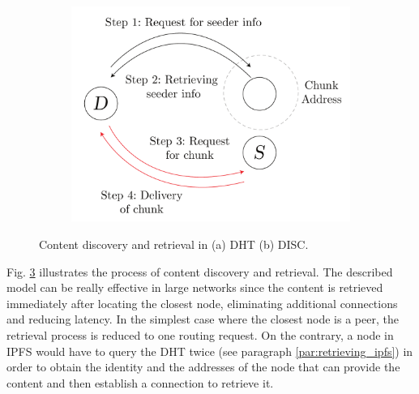 \begin{figure}
    \begin{subfigure}{0.5\textwidth}
        \centering
        \includegraphics[width=\linewidth]{figs/dht.pdf}
        \caption{}
        \label{fig:dht}
    \end{subfigure}
    \hfill
    \begin{subfigure}{0.5\textwidth}
        \centering
        \caption{}
        \label{fig:disc}
    \end{subfigure}
    \caption{Content discovery and retrieval in (a) DHT (b) DISC. \citep{tron_2020}}
    \label{fig:content_discovery}
\end{figure}

Fig. \ref{fig:content_discovery} illustrates the process of content discovery and retrieval. The described model can be really effective in large networks since the content is retrieved immediately after locating the closest node, eliminating additional connections and reducing latency. In the simplest case where the closest node is a peer, the retrieval process is reduced to one routing request. On the contrary, a node in IPFS would have to query the DHT twice (see paragraph \ref{par:retrieving_ipfs}) in order to obtain the identity and the addresses of the node that can provide the content and then establish a connection to retrieve it. 

